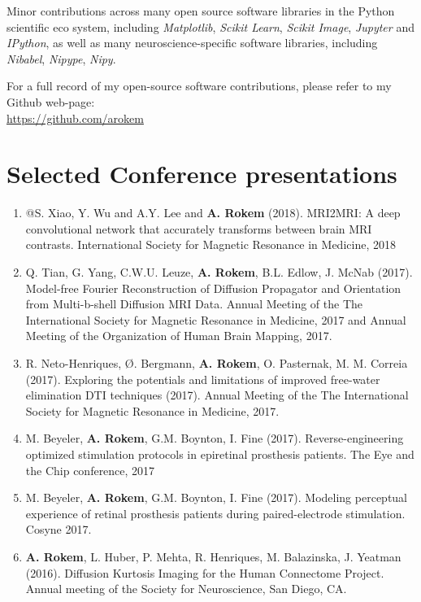 \documentclass[11pt,fullpage]{article}
\begin{document}
Minor contributions across many open source software libraries in the Python
scientific eco system, including \emph{Matplotlib}, \emph{Scikit Learn},
\emph{Scikit Image}, \emph{Jupyter} and \emph{IPython}, as well as many neuroscience-specific software libraries, including \emph{Nibabel}, \emph{Nipype}, \emph{Nipy}.

For a full record of my open-source software contributions, please refer to my
Github web-page: \\ \url{https://github.com/arokem}

\section*{Selected Conference presentations}
\begin{enumerate}

\item @S. Xiao, Y. Wu and A.Y. Lee and {\bf A. Rokem} (2018).
MRI2MRI: A deep convolutional network that accurately transforms between brain MRI contrasts.
International Society for Magnetic Resonance in Medicine, 2018

\item Q. Tian, G. Yang, C.W.U. Leuze, {\bf A. Rokem}, B.L. Edlow, J. McNab
(2017). Model-free Fourier Reconstruction of Diffusion Propagator and
Orientation from Multi-b-shell Diffusion MRI Data. Annual Meeting of the The
International Society for Magnetic Resonance in Medicine, 2017 and Annual Meeting of the Organization of Human Brain Mapping, 2017.

\item R. Neto-Henriques, Ø. Bergmann, {\bf A. Rokem}, O. Pasternak, M. M.
Correia (2017).  Exploring the potentials and limitations of improved free-water
elimination DTI techniques (2017). Annual Meeting of the The International
Society for Magnetic Resonance in Medicine, 2017.

\item M. Beyeler, {\bf A. Rokem}, G.M. Boynton, I. Fine (2017).
Reverse-engineering optimized stimulation protocols in epiretinal prosthesis
patients. The Eye and the Chip conference, 2017

\item M. Beyeler, {\bf A. Rokem}, G.M. Boynton, I. Fine (2017). Modeling
perceptual experience of retinal prosthesis patients during paired-electrode
stimulation. Cosyne 2017.

\item {\bf A. Rokem}, L. Huber, P. Mehta, R. Henriques, M. Balazinska, J. Yeatman (2016). Diffusion Kurtosis Imaging for the Human Connectome Project. Annual meeting of the Society for Neuroscience, San Diego, CA.


\end{enumerate}
\end{document}
